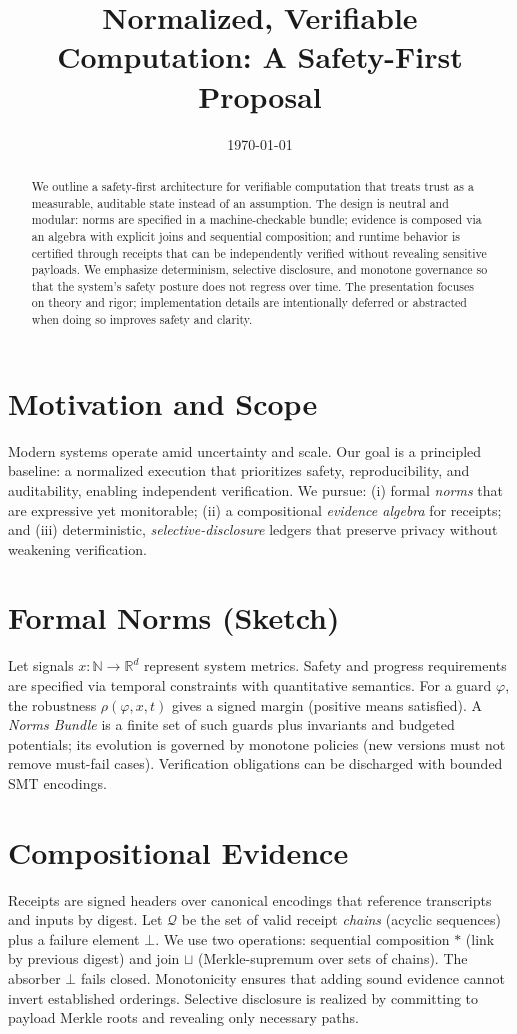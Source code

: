 \documentclass[11pt,a4paper]{article}
\title{Normalized, Verifiable Computation: A Safety-First Proposal}
\author{}
\date{\today}
\numberwithin{equation}{section}
\theoremstyle{plain}
\theoremstyle{definition}
\theoremstyle{remark}
\newcommand{\bbR}{\mathbb{R}}
\newcommand{\calQ}{\mathcal{Q}}  %
\newcommand{\join}{\sqcup}        %
\begin{document}
\maketitle

\begin{abstract}
We outline a safety-first architecture for verifiable computation that treats trust as a measurable, auditable state instead of an assumption. The design is neutral and modular: norms are specified in a machine-checkable bundle; evidence is composed via an algebra with explicit joins and sequential composition; and runtime behavior is certified through receipts that can be independently verified without revealing sensitive payloads. We emphasize determinism, selective disclosure, and monotone governance so that the system's safety posture does not regress over time. The presentation focuses on theory and rigor; implementation details are intentionally deferred or abstracted when doing so improves safety and clarity.
\end{abstract}

\section{Motivation and Scope}
Modern systems operate amid uncertainty and scale. Our goal is a principled baseline: a normalized execution that prioritizes safety, reproducibility, and auditability, enabling independent verification. We pursue:
(i) formal \emph{norms} that are expressive yet monitorable;
(ii) a compositional \emph{evidence algebra} for receipts; and
(iii) deterministic, \emph{selective-disclosure} ledgers that preserve privacy without weakening verification.

\section{Formal Norms (Sketch)}
Let signals $x:\mathbb{N}\to\bbR^d$ represent system metrics. Safety and progress requirements are specified via temporal constraints with quantitative semantics. For a guard $\varphi$, the robustness $\rho(\varphi,x,t)$ gives a signed margin (positive means satisfied). A \emph{Norms Bundle} is a finite set of such guards plus invariants and budgeted potentials; its evolution is governed by monotone policies (new versions must not remove must-fail cases). Verification obligations can be discharged with bounded SMT encodings.

\section{Compositional Evidence}
Receipts are signed headers over canonical encodings that reference transcripts and inputs by digest. Let $\calQ$ be the set of valid receipt \emph{chains} (acyclic sequences) plus a failure element $\bot$.
We use two operations: sequential composition $*$ (link by previous digest) and join $\join$ (Merkle-supremum over sets of chains). The absorber $\bot$ fails closed. Monotonicity ensures that adding sound evidence cannot invert established orderings. Selective disclosure is realized by committing to payload Merkle roots and revealing only necessary paths.
\end{document}
